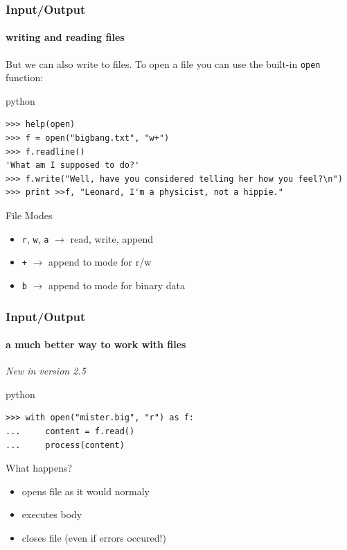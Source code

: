 \documentclass{beamer}
\begin{document}
\begin{frame}[fragile]
	\frametitle{Input/Output}
	\framesubtitle{writing and reading files}

	But we can also write to files. To open a file you can use the built-in \texttt{open} function:
	\begin{exampleblock}{python}
	\begin{lstlisting}
>>> help(open)
>>> f = open("bigbang.txt", "w+")
>>> f.readline()
'What am I supposed to do?'
>>> f.write("Well, have you considered telling her how you feel?\n")
>>> print >>f, "Leonard, I'm a physicist, not a hippie."
	\end{lstlisting}
	\end{exampleblock}

\pause
	
	\begin{block}{File Modes}
	\begin{itemize}
		\item \texttt{r}, \texttt{w}, \texttt{a} $ \rightarrow $ read, write, append
		\item \texttt{+} $ \rightarrow $ append to mode for r/w
		\item \texttt{b} $ \rightarrow $ append to mode for binary data
	\end{itemize}
	\end{block}
\end{frame}

\begin{frame}[fragile]
	\frametitle{Input/Output}
	\framesubtitle{a much better way to work with files}
	\emph{New in version 2.5}
	\begin{exampleblock}{python}
	\begin{lstlisting}
>>> with open("mister.big", "r") as f:
...     content = f.read()
...     process(content)
	\end{lstlisting}
	\end{exampleblock}

\pause

	\begin{block}{What happens?}
	\begin{itemize}
		\item opens file as it would normaly
		\item executes body
		\item closes file (even if errors occured!)
	\end{itemize}
	\end{block}
\end{frame}
\end{document}
